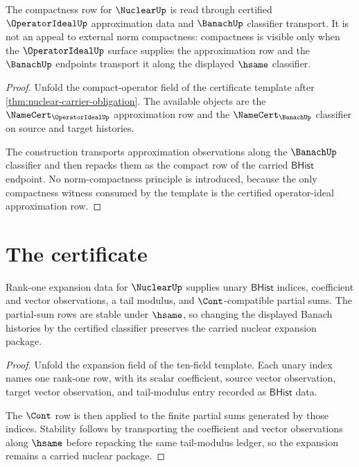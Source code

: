 \begin{theorem}\label{thm:nuclear-compact-operator-obligation}
The compactness row for $\NuclearUp$ is read through certified $\OperatorIdealUp$ approximation data and $\BanachUp$ classifier transport. It is not an appeal to external norm compactness: compactness is visible only when the $\OperatorIdealUp$ surface supplies the approximation row and the $\BanachUp$ endpoints transport it along the displayed $\hsame$ classifier.
\end{theorem}
\begin{proof}
Unfold the compact-operator field of the certificate template after \autoref{thm:nuclear-carrier-obligation}. The available objects are the $\NameCert_{\OperatorIdealUp}$ approximation row and the $\NameCert_{\BanachUp}$ classifier on source and target histories.

The construction transports approximation observations along the $\BanachUp$ classifier and then repacks them as the compact row of the carried $\mathsf{BHist}$ endpoint. No norm-compactness principle is introduced, because the only compactness witness consumed by the template is the certified operator-ideal approximation row.
\end{proof}

\section{The certificate}
\label{sec:nuclear-certificate}

\begin{theorem}\label{thm:nuclear-rank-one-sum-obligation}
Rank-one expansion data for $\NuclearUp$ supplies unary $\mathsf{BHist}$ indices, coefficient and vector observations, a tail modulus, and $\Cont$-compatible partial sums. The partial-sum rows are stable under $\hsame$, so changing the displayed Banach histories by the certified classifier preserves the carried nuclear expansion package.
\end{theorem}
\begin{proof}
Unfold the expansion field of the ten-field template. Each unary index names one rank-one row, with its scalar coefficient, source vector observation, target vector observation, and tail-modulus entry recorded as $\mathsf{BHist}$ data.

The $\Cont$ row is then applied to the finite partial sums generated by those indices. Stability follows by transporting the coefficient and vector observations along $\hsame$ before repacking the same tail-modulus ledger, so the expansion remains a carried nuclear package.
\end{proof}

